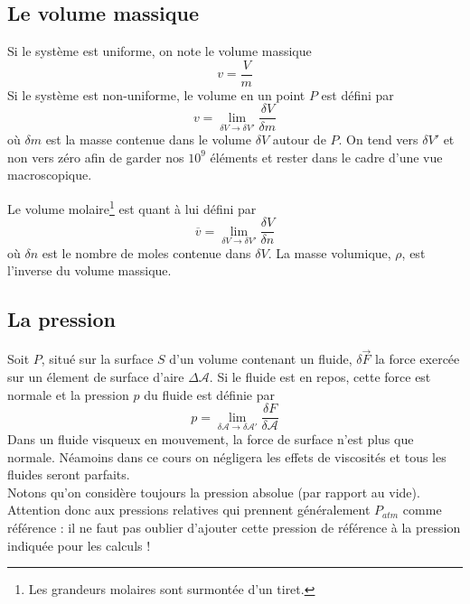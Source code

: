 	
	\subsection{Le volume massique}
	Si le système est uniforme, on note le volume massique 
	\begin{equation}
	v = \frac{V}{m}
	\end{equation}
	Si le système est non-uniforme, le volume en un point $P$ est défini 
	par
	\begin{equation}
	v = \lim\limits_{\delta V \rightarrow \delta V'} \frac{\delta V}{
	\delta m}
	\end{equation}
	où $\delta m$ est la masse contenue dans le volume $\delta V$ autour 
	de $P$. On tend vers $\delta V'$ et non vers zéro afin de garder nos 
	$10^9$ éléments et rester dans le cadre d'une vue macroscopique.
	
	Le volume molaire\footnote{Les grandeurs molaires sont surmontée d'un 
	tiret.} est quant à lui défini par
	\begin{equation}
	\overline{v} = \lim\limits_{\delta V \rightarrow \delta V'} \frac{
	\delta V}{\delta n}
	\end{equation}
	où $\delta n$ est le nombre de moles contenue dans $\delta V$. La 
	masse volumique, $\rho$, est l'inverse du volume massique.
	
	
	\subsection{La pression}
	Soit $P$, situé sur la surface $S$ d'un volume contenant un fluide, 
	$\delta \vec F$ la force exercée sur un élement de surface d'aire 
	$\Delta \mathcal{A}$. Si le fluide est en repos, cette force est 
	normale et la pression $p$ du fluide est définie par
	\begin{equation}
	p = \lim\limits_{\delta\mathcal{A}\rightarrow\delta\mathcal{A}'} 
	\frac{\delta F}{\delta \mathcal{A}}
	\end{equation}		
	Dans un fluide visqueux en mouvement, la force de surface n'est 
	plus que normale. Néamoins dans ce cours on négligera les effets 
	de viscosités et tous les fluides seront parfaits.\\
	Notons qu'on considère toujours la pression absolue (par rapport 
	au vide). Attention donc aux pressions relatives qui prennent 
	généralement $P_{atm}$ comme référence : il ne faut pas oublier 
	d'ajouter cette pression de référence à la pression indiquée 
	pour les calculs !
	
	
